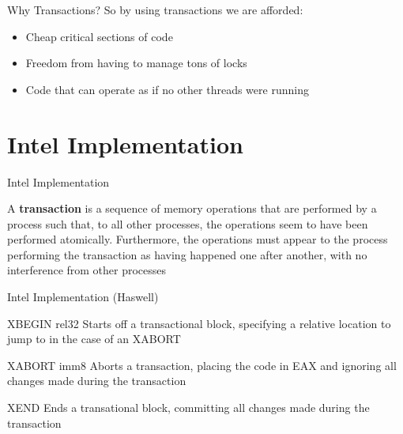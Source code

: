 \documentclass{beamer}
\begin{document}
\begin{frame}{Why Transactions?}
  So by using transactions we are afforded:
  \begin{itemize}
    \item Cheap critical sections of code
    \pause
    \item Freedom from having to manage tons of locks
    \pause
    \item Code that can operate as if no other threads were running
  \end{itemize}
\end{frame}

\section{Intel Implementation}
\begin{frame}{Intel Implementation}
  \begin{definition}
  A \textbf{transaction} is a sequence of memory operations that are 
  performed by a process such that, to all other processes, the operations 
  seem to have been performed atomically. Furthermore, the operations must 
  appear to the process performing the transaction as having happened one
  after another, with no interference from other processes
  \end{definition}
\end{frame}

\begin{frame}{Intel Implementation (Haswell)}
  \begin{block}{XBEGIN rel32}
  Starts off a transactional block, specifying a relative location to jump to
  in the case of an XABORT
  \end{block}

  \pause

  \begin{block}{XABORT imm8}
  Aborts a transaction, placing the code in EAX and ignoring all changes made
  during the transaction
  \end{block}

  \pause

  \begin{block}{XEND}
  Ends a transational block, committing all changes made during the
  transaction
  \end{block}
\end{frame}
\end{document}

